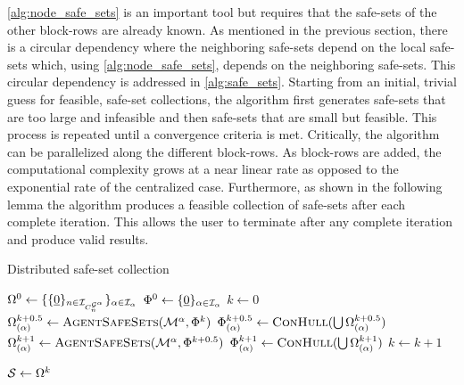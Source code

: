 \autoref{alg:node_safe_sets} is an important tool but requires that the safe-sets of the other block-rows are already known. As mentioned in the previous section, there is a circular dependency where the neighboring safe-sets depend on the local safe-sets which, using \autoref{alg:node_safe_sets}, depends on the neighboring safe-sets. This circular dependency is addressed in \autoref{alg:safe_sets}. Starting from an initial, trivial guess for feasible, safe-set collections, the algorithm first generates safe-sets that are too large and infeasible and then safe-sets that are small but feasible. This process is repeated until a convergence criteria is met. Critically, the algorithm can be parallelized along the different block-rows. As block-rows are added, the computational complexity grows at a near linear rate as opposed to the exponential rate of the centralized case. Furthermore, as shown in the following lemma the algorithm produces a feasible collection of safe-sets after each complete iteration. This allows the user to terminate after any complete iteration and produce valid results. 
\begin{algorithm}[b]
\caption{Distributed safe-set collection}\label{alg:safe_sets}
\begin{algorithmic}[1]
\State $\Omega^0\gets\{\{\underline{0}\}_{n\in\idxset{\gnumnodes[\agentidx]}}\}_{\agentidx\in\mathcal{I}_\agentidx}$
\State $\Phi^0\gets\{\underline{0}\}_{\alpha\in\mathcal{I}_{\alpha}}$
\State $k\gets0$
\Repeat 
		\State $\Omega^{k+0.5}_{(\agentidx)}\gets\Call{AgentSafeSets}{\modes[\agentidx], \Phi^k}$
		\State $\Phi^{k+0.5}_{(\agentidx)}\gets\Call{ConHull}{\bigcup\Omega^{k+0.5}_{(\agentidx)}}$
	\EndParFor
		\State $\Omega^{k+1}_{(\agentidx)}\gets\Call{AgentSafeSets}{\modes[\agentidx], \Phi^{k+0.5}}$
		\State $\Phi^{k+1}_{(\agentidx)}\gets\Call{ConHull}{\bigcup\Omega^{k+1}_{(\agentidx)}}$
	\EndParFor
	\State $k\gets k+1$

\State $\mathcal{S}\gets\Omega^k$
\EndProcedure
\end{algorithmic}
\end{algorithm}

